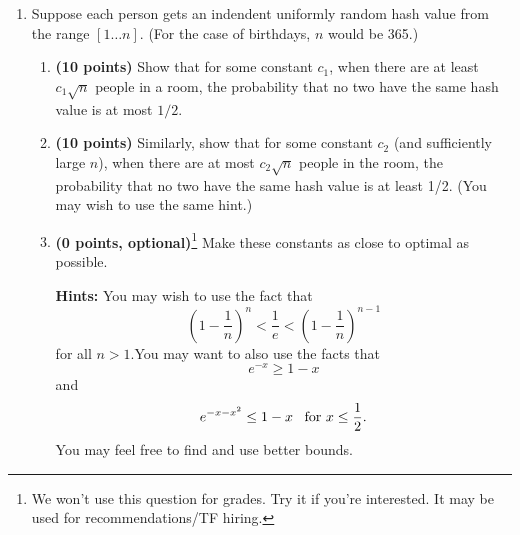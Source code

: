 \documentclass[10pt]{article}
\begin{document}
\begin{enumerate}


\item Suppose each person gets an indendent uniformly random hash value from the range
$[1\ldots n]$.  (For the case of birthdays, $n$ would be 365.)
\begin{enumerate}
\item
{\bf (10 points)}
Show that for some constant $c_1$, when there are at least $c_1
\sqrt{n}$ people in a room, the probability that no two have the
same hash value is at most $1/2$. 
\item
{\bf (10 points)}
Similarly, show that for some
constant $c_2$ (and sufficiently large $n$), when there are at most
$c_2 \sqrt{n}$ people in the room, the probability that no two have
the same hash value is at least 1/2. (You may wish to use the same hint.)
\item
{\bf (0 points, optional)}\footnote{We won't use this question for grades. Try it if you're interested. It may be used for recommendations/TF hiring.}
 Make these constants as close to optimal as possible.

{\bf Hints:} You may wish to use the fact that 
$$(1-\frac1n)^n < \frac1e < (1-\frac1n)^{n-1}$$
for all $n > 1$.You may want to also use the facts that $$e^{-x} \geq 1 -x$$ and 
$$e^{-x-x^2} \leq 1 -x \, \, \, \mbox{ for } x \leq {1 \over 2}.$$
You may feel free to find and use better bounds.
\end{enumerate}


\end{enumerate}
\end{document}
